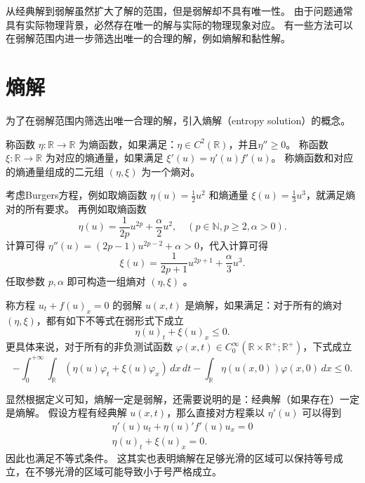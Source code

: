 从经典解到弱解虽然扩大了解的范围，但是弱解却不具有唯一性。
由于问题通常具有实际物理背景，必然存在唯一的解与实际的物理现象对应。
有一些方法可以在弱解范围内进一步筛选出唯一的合理的解，例如熵解和黏性解。

\section{熵解}

为了在弱解范围内筛选出唯一合理的解，引入熵解（entropy solution）的概念。

\begin{definition}[熵函数和熵通量]
    称函数 $\eta: \mathbb{R} \to \mathbb{R}$ 为熵函数，如果满足：$\eta \in C^2(\mathbb{R})$，并且$\eta'' \ge 0$。
    称函数 $\xi: \mathbb{R} \to \mathbb{R}$ 为对应的熵通量，如果满足 $\xi'(u) = \eta'(u) f'(u)$。
    称熵函数和对应的熵通量组成的二元组 $(\eta,\xi)$ 为一个熵对。
\end{definition}

\begin{example}
    考虑Burgers方程，例如取熵函数 $\eta(u) = \frac{1}{2} u^2$ 和熵通量 $\xi(u) = \frac{1}{3} u^3$，就满足熵对的所有要求。
    再例如取熵函数
    \[
        \eta(u) = \frac{1}{2p} u^{2p} + \frac{\alpha}2 u^2,\quad (p \in \mathbb{N}, p \ge2, \alpha > 0).
    \]
    计算可得 $\eta''(u) = (2p-1) u^{2p-2} + \alpha > 0$，代入计算可得
    \[
        \xi(u) = \frac{1}{2p+1} u^{2p+1} + \frac{\alpha}3 u^3.
    \]
    任取参数 $p,\alpha$ 即可构造一组熵对 $(\eta,\xi)$ 。
\end{example}

\begin{definition}
    称方程 $u_t + f(u)_x = 0$ 的弱解 $u(x,t)$ 是熵解，如果满足：对于所有的熵对 $(\eta,\xi)$，都有如下不等式在弱形式下成立
    \[
        \eta(u)_t + \xi(u)_x \le 0.
    \]
    更具体来说，对于所有的非负测试函数 $\varphi(x,t) \in C_0^\infty(\mathbb{R} \times \mathbb{R}^+;\mathbb{R}^+)$，下式成立
    \[
        - \int_0^{+\infty} \int_{\mathbb{R}}(\eta(u) \varphi_t + \xi(u) \varphi_x) \,dx\,dt
        - \int_{\mathbb{R}} \eta(u(x,0))\varphi(x,0)\,dx \le 0.
    \]
\end{definition}


显然根据定义可知，熵解一定是弱解，还需要说明的是：经典解（如果存在）一定是熵解。
假设方程有经典解 $u(x,t)$，那么直接对方程乘以 $\eta'(u)$ 可以得到
\begin{gather*}
    \eta'(u) u_t + \eta(u)' f'(u) u_x = 0 \\
    \eta(u)_t + \xi(u)_x = 0.
\end{gather*}
因此也满足不等式条件。
这其实也表明熵解在足够光滑的区域可以保持等号成立，在不够光滑的区域可能导致小于号严格成立。

